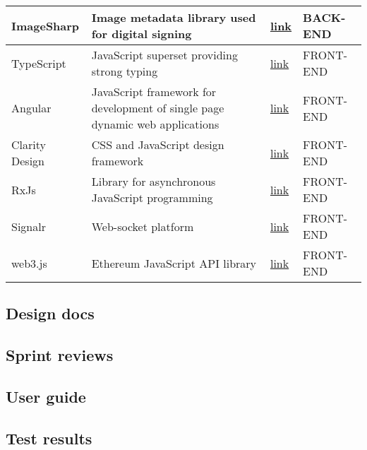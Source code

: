 \begin{table}[H]
\begin{tabular}{|p{}|p{}|p{}|p{}|}
ImageSharp     & Image metadata library used for digital signing                                       & \href{https://github.com/SixLabors/ImageSharp}{link}           & BACK-END  \\ \hline
TypeScript     & JavaScript superset providing strong typing                                           & \href{https://www.typescriptlang.org/}{link}                   & FRONT-END \\ \hline
Angular        & JavaScript framework for development of single page dynamic web applications          & \href{https://angular.io/}{link}                               & FRONT-END \\ \hline
Clarity Design & CSS and JavaScript design framework                                                   & \href{https://clarity.design/}{link}                           & FRONT-END \\ \hline
RxJs           & Library for asynchronous JavaScript programming                                       & \href{https://rxjs.dev/}{link}                                 & FRONT-END \\ \hline
Signalr        & Web-socket platform                                                                   & \href{https://www.npmjs.com/package/@microsoft/signalr}{link}  & FRONT-END \\ \hline
web3.js        & Ethereum JavaScript API library                                                       & \href{https://www.npmjs.com/package/web3}{link}                & FRONT-END \\ \hline
\end{tabular}
\end{table}

\subsection{Design docs}
\subsection{Sprint reviews}
\subsection{User guide}



\subsection{Test results}